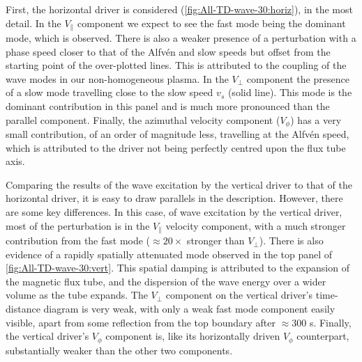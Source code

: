 \documentclass[a4paper,12pt,fourier,authoryear,custommargin]{Classes/PhDThesisPSnPDF}
\begin{document}
First, the horizontal driver is considered (\cref{fig:All-TD-wave-30:horiz}), in the most detail.
In the $V_\parallel$ component we expect to see the fast mode being the dominant mode, which is observed.
There is also a weaker presence of a perturbation with a phase speed closer to that of the Alfv\'en and slow speeds but offset from the starting point of the over-plotted lines.
This is attributed to the coupling of the wave modes in our non-homogeneous plasma.
In the $V_\perp$ component the presence of a slow mode travelling close to the slow speed $v_s$ (solid line).
This mode is the dominant contribution in this panel and is much more pronounced than the parallel component.
Finally, the azimuthal velocity component ($V_\phi$) has a very small contribution, of an order of magnitude less, travelling at the Alfv\'en speed, which is attributed to the driver not being perfectly centred upon the flux tube axis.

Comparing the results of the wave excitation by the vertical driver to that of the horizontal driver, it is easy to draw parallels in the description.
However, there are some key differences.
In this case, of wave excitation by the vertical driver, most of the perturbation is in the $V_\parallel$ velocity component, with a much stronger contribution from the fast mode ($\approx 20 \times$ stronger than $V_\perp$).
There is also evidence of a rapidly spatially attenuated mode observed in the top panel of \cref{fig:All-TD-wave-30:vert}.
This spatial damping is attributed to the expansion of the magnetic flux tube, and the dispersion of the wave energy over a wider volume as the tube expands.
The $V_\perp$ component on the vertical driver's time-distance diagram is very weak, with only a weak fast mode component easily visible, apart from some reflection from the top boundary after $\approx300$ s.
Finally, the vertical driver's $V_\phi$ component is, like its horizontally driven $V_\phi$ counterpart, substantially weaker than the other two components.
\end{document}
